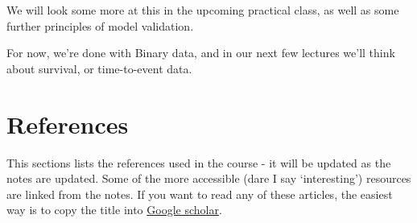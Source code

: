 \documentclass[
  openany]{book}
\theoremstyle{definition}
\theoremstyle{definition}
\theoremstyle{definition}
\theoremstyle{definition}
\theoremstyle{remark}
\begin{document}
We will look some more at this in the upcoming practical class, as well as some further principles of model validation.

For now, we're done with Binary data, and in our next few lectures we'll think about survival, or time-to-event data.

\chapter*{References}\label{references}

This sections lists the references used in the course - it will be updated as the notes are updated. Some of the more accessible (dare I say `interesting') resources are linked from the notes. If you want to read any of these articles, the easiest way is to copy the title into \href{https://scholar.google.co.uk/}{Google scholar}.

  
\end{document}
